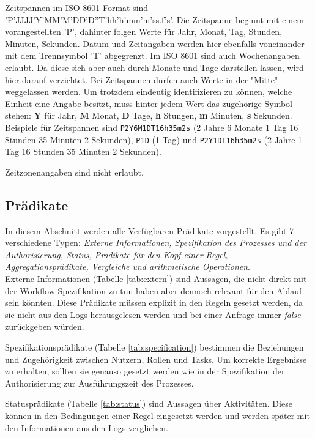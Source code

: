 Zeitspannen im ISO 8601 Format sind 'P'JJJJ'Y'MM'M'DD'D''T'hh'h'mm'm'ss.f's'. Die Zeitspanne beginnt mit einem vorangestellten 'P', dahinter folgen Werte für Jahr, Monat, Tag, Stunden, Minuten, Sekunden. Datum und Zeitangaben werden hier ebenfalls voneinander mit dem Trennsymbol 'T' abgegrenzt. Im ISO 8601 sind auch Wochenangaben erlaubt. Da diese sich aber auch durch Monate und Tage darstellen lassen, wird hier darauf verzichtet. Bei Zeitspannen dürfen auch Werte in der "Mitte" weggelassen werden. Um trotzdem eindeutig identifizieren zu können, welche Einheit eine Angabe besitzt, muss hinter jedem Wert das zugehörige Symbol stehen: \textbf{Y} für Jahr, \textbf{M} Monat, \textbf{D} Tage, \textbf{h} Stungen, \textbf{m} Minuten, \textbf{s} Sekunden. Beispiele für Zeitspannen sind \texttt{P2Y6M1DT16h35m2s} (2 Jahre 6 Monate 1 Tag 16 Stunden 35 Minuten 2 Sekunden), \texttt{P1D} (1 Tag) und \texttt{P2Y1DT16h35m2s} (2 Jahre 1 Tag 16 Stunden 35 Minuten 2 Sekunden).

Zeitzonenangaben sind nicht erlaubt.

\subsection{Prädikate}
In diesem Abschnitt werden alle Verfügbaren Prädikate vorgestellt. Es gibt  7 verschiedene Typen: \textit{Externe Informationen, Spezifikation des Prozesses und der Authorisierung, Status, Prädikate für den Kopf einer Regel, Aggregationsprädikate, Vergleiche und arithmetische Operationen}. \\

Externe Informationen (Tabelle \ref{tab:extern}) sind Aussagen, die nicht direkt mit der Workflow Spezifikation zu tun haben aber dennoch relevant für den Ablauf sein könnten. Diese Prädikate müssen explizit in den Regeln gesetzt werden, da sie nicht aus den Logs herausgelesen werden und bei einer Anfrage immer \textit{false} zurückgeben würden.


Spezifikationsprädikate (Tabelle \ref{tab:specification}) bestimmen die Beziehungen und Zugehörigkeit zwischen Nutzern, Rollen und Tasks. Um korrekte Ergebnisse zu erhalten, sollten sie genauso gesetzt werden wie in der Spezifikation der Authorisierung zur Ausführungszeit des Prozesses.


Statusprädikate (Tabelle \ref{tab:status}) sind Aussagen über Aktivitäten. Diese können in den Bedingungen einer Regel eingesetzt werden und werden später mit den Informationen aus den Logs verglichen. 


